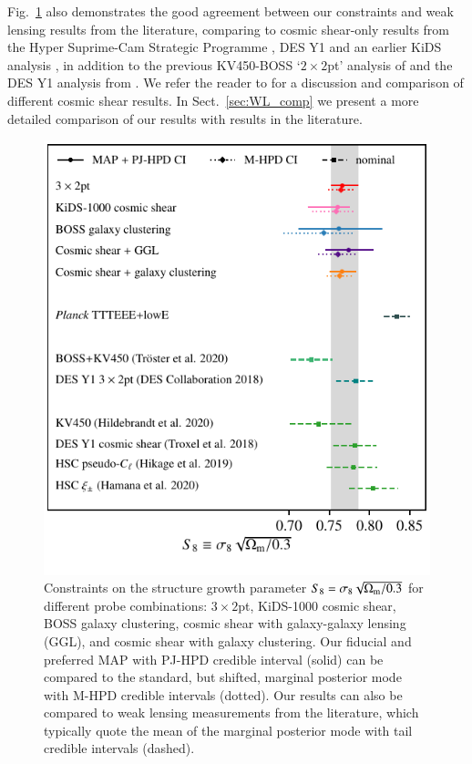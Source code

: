 Fig.~\ref{fig:S8comp} also demonstrates the good agreement between our constraints and weak lensing results from the literature, comparing to cosmic shear-only results from the Hyper Suprime-Cam Strategic Programme \citep[HSC,][]{hikage/etal:2019,hamana/etal:2020}, DES Y1 \citep{troxel/etal:2018} and an earlier KiDS analysis \citep[KV450][]{hildebrandt/etal:2020}, in addition to the previous KV450-BOSS `$2\times2$pt' analysis of \citet{troester/etal:2020} and the DES Y1 \tttp analysis from \citet{abbott/etal:2018}.   We refer the reader to \citet{asgari/etal:inprep} for a discussion and comparison of different cosmic shear results.  In Sect.~\ref{sec:WL_comp} we present a more detailed comparison of our results with \tttp results in the literature.

\begin{figure}
	\begin{center}
		\includegraphics[width=\columnwidth]{Parameter_Plots/cosmology/S8_comparison_blindC}
		\caption{Constraints on the structure growth parameter $S_{8} = \sigma_8 \sqrt{\Omega_{\rm m}/0.3}$ for different probe combinations: $3\times2$pt, KiDS-1000 cosmic shear, BOSS galaxy clustering, cosmic shear with galaxy-galaxy lensing (GGL), and cosmic shear with galaxy clustering.   Our fiducial and preferred MAP with PJ-HPD credible interval (solid) can be compared to the standard, but shifted, marginal posterior mode with M-HPD credible intervals (dotted).    Our results can also be compared to weak lensing measurements from the literature, which typically quote the mean of the marginal posterior mode with tail credible intervals (dashed). 
		\label{fig:S8comp}}
	\end{center}
\end{figure}

